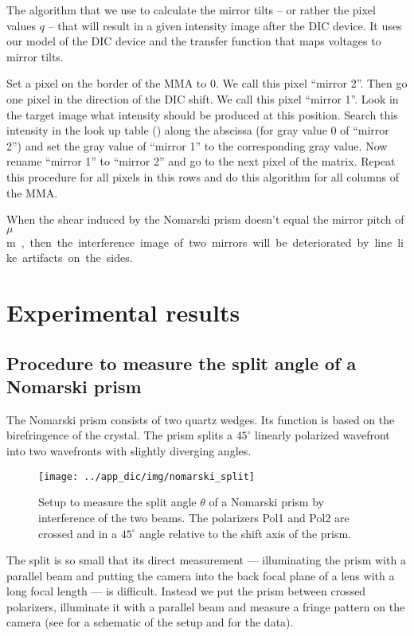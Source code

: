 The algorithm that we use to calculate the mirror tilts -- or rather
the pixel values $q$ -- that will result in a given intensity image
after the DIC device. It uses our model of the DIC device and the
transfer function that maps voltages to mirror tilts.

Set a pixel on the border of the MMA to 0. We call this pixel ``mirror
2''. Then go one pixel in the direction of the DIC shift. We call this
pixel ``mirror 1''. Look in the target image what intensity should be
produced at this position. Search this intensity in the look up table
() along the abscissa (for gray value 0 of
``mirror 2'') and set the gray value of ``mirror 1'' to the
corresponding gray value. Now rename ``mirror 1'' to ``mirror 2'' and
go to the next pixel of the matrix. Repeat this procedure for all
pixels in this rows and do this algorithm for all columns of the MMA.

When the shear induced by the Nomarski prism doesn't equal the mirror
pitch of \unit[16]{$\mu$m}, then the interference image of two
mirrors will be deteriorated by line like artifacts on the sides.

\section{Experimental results}
\subsection{Procedure to measure the split angle of a Nomarski prism}
\label{sec:prism}
The Nomarski prism consists of two quartz wedges. Its function is
based on the birefringence of the crystal. The prism splits a
$45^\circ$ linearly polarized wavefront into two wavefronts with
slightly diverging angles.
\begin{figure}[htb]
  \centering
  \texttt{[image: ../app\_dic/img/nomarski\_split]}
  \caption{Setup to measure the split angle $\theta$ of a Nomarski
    prism by interference of the two beams. The polarizers Pol1 and
    Pol2 are crossed and in a $45^\circ$ angle relative to the shift
    axis of the prism.}
  \label{fig:nomarski_split}
\end{figure}
The split is so small that its direct measurement --- illuminating the
prism with a parallel beam and putting the camera into the back focal
plane of a lens with a long focal length --- is difficult.  Instead we
put the prism between crossed polarizers, illuminate it with a
parallel beam and measure a fringe pattern on the camera (see
 for a schematic of the setup and
 for the data).


